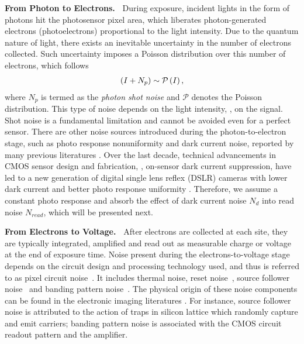 \documentclass[10pt,twocolumn,letterpaper]{article}
\begin{document}
\vspace{3pt}
\noindent\textbf{From Photon to Electrons.~}
During exposure, incident lights in the form of photons hit the photosensor pixel area, which liberates photon-generated electrons
(photoelectrons) proportional to the light
intensity. 
Due to the quantum nature of light, there exists an inevitable
uncertainty in the number of electrons collected. Such uncertainty imposes a Poisson distribution over this number of electrons, which follows
\vspace{-1mm}
 \begin{align}
(I + N_p) \sim \mathcal{P} \left( I \right),
\label{eq: noise-poisson}
 \vspace{-1mm}
 \end{align}
where $N_p$ is termed as the \textit{photon shot noise} and $\mathcal{P}$ denotes the
Poisson distribution. This type of noise depends on the light intensity, \ie, on
the signal. Shot noise is a fundamental limitation and cannot be avoided even
for a perfect sensor. There are other noise sources introduced during the
photon-to-electron stage, such as photo response nonuniformity and dark current
noise, reported by many previous literatures \cite{Healey1994Radiometric,Gow2007A,Wach2004Noise,Baer2006A}. Over the last decade, technical advancements
in CMOS sensor design and fabrication, \eg, on-sensor dark current suppression,
have led to a new generation of digital single lens reflex (DSLR) cameras with lower dark current and better
photo response uniformity \cite{Fossum2014A,lin2016high}. Therefore, we assume a constant
photo response and absorb the effect of dark current noise $N_d$ into read noise $N_{read}$, which will be presented next.
 
\vspace{3pt}
\noindent\textbf{From Electrons to Voltage.~}
After electrons are collected at each site, they are typically integrated, amplified
and read out as measurable charge or voltage at the end of exposure time.
Noise present during the electrons-to-voltage stage depends on the circuit design and processing technology used, and thus is referred to as pixel circuit noise~\cite{Gow2007A}. It includes thermal noise, reset noise~\cite{Mikhail2014Highlevel}, source follower noise~\cite{Leyris2005Trap} and banding pattern noise~\cite{Gow2007A}. The physical origin of these noise components can be found in the electronic imaging literatures \cite{Mikhail2014Highlevel,Gow2007A,Wach2004Noise,Leyris2005Trap}. For instance, source follower noise is attributed to the action of traps in silicon lattice which randomly capture and emit carriers; banding pattern noise is associated with the CMOS circuit readout pattern and the amplifier.  
\end{document}
